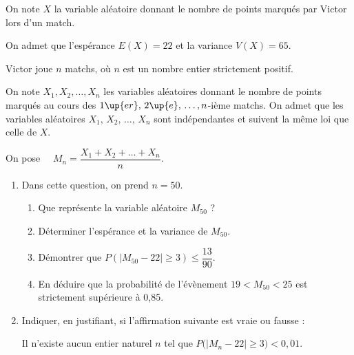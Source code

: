On note $X$ la variable aléatoire donnant le nombre de points marqués par Victor lors d'un match.

\medskip

On admet que l'espérance $E(X) = 22$ et la variance $V(X) = 65$.

\medskip

Victor joue $n$ matchs, où $n$ est un nombre entier strictement positif.

On note $X_{1}, X_{2}, \ldots, X_{n}$ les variables aléatoires donnant le nombre de points marqués au cours des $1\up{er},\, 2\up{e},\, \ldots, n$-ième matchs. On admet que les variables aléatoires $X_{1},\, X_{2},\, \ldots,\, X_{n}$ sont indépendantes et suivent la même loi que celle de $X$.

\medskip

On pose $\quad M_{n}=\dfrac{X_{1} + X_{2} + \ldots + X_{n}}{n}$.

\medskip

\begin{enumerate}
\item Dans cette question, on prend $n = 50$.

	\begin{enumerate}
		\item Que représente la variable aléatoire $M_{50}$ ?
		\item Déterminer l'espérance et la variance de $M_{50}$.
		\item Démontrer que $P\left(\left|M_{50}-22\right| \geqslant 3\right) \leqslant \dfrac{13}{90}$.
		\item En déduire que la probabilité de l'évènement \og  $19<M_{50}<25$ \fg{}  est strictement supérieure à 0,85.
	\end{enumerate}
\item Indiquer, en justifiant, si l'affirmation suivante est vraie ou fausse :

	\og Il n'existe aucun entier naturel $n$ tel que $P\big(\left|M_{n}-22\right| \geqslant 3\big)< 0,01$\fg.
\end{enumerate}


\bigskip
